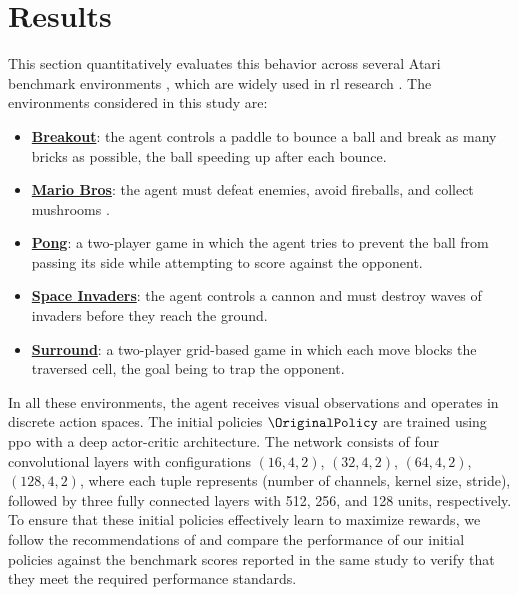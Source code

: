 \section{Results}
\label{sec:clustering_agent_representation_results}

This section quantitatively evaluates this behavior across several Atari benchmark environments \cite{Bellemare_2013}, which are widely used in \gls{rl} research \cite{mnih2013playingatarideepreinforcement, schulman2017proximalpolicyoptimizationalgorithms, zahavy2017graying}.
The environments considered in this study are:

\begin{itemize}
    \item \href{https://ale.farama.org/environments/breakout/}{\textbf{Breakout}}: the agent controls a paddle to bounce a ball and break as many bricks as possible, the ball speeding up after each bounce.
    \item \href{https://ale.farama.org/environments/mario_bros/}{\textbf{Mario Bros}}: the agent must defeat enemies, avoid fireballs, and collect mushrooms \cite{mario_bros_atari_2600}.
    \item \href{https://ale.farama.org/environments/pong/}{\textbf{Pong}}: a two-player game in which the agent tries to prevent the ball from passing its side while attempting to score against the opponent.
    \item \href{https://ale.farama.org/environments/space_invaders/}{\textbf{Space Invaders}}: the agent controls a cannon and must destroy waves of invaders before they reach the ground.
    \item \href{https://ale.farama.org/environments/surround/}{\textbf{Surround}}: a two-player grid-based game in which each move blocks the traversed cell, the goal being to trap the opponent.
\end{itemize}

In all these environments, the agent receives visual observations and operates in discrete action spaces.
The initial policies $\OriginalPolicy$ are trained using \gls{ppo} \cite{schulman2017proximalpolicyoptimizationalgorithms} with a deep actor-critic architecture.
The network consists of four convolutional layers with configurations $(16, 4, 2)$, $(32, 4, 2)$, $(64, 4, 2)$, $(128, 4, 2)$, where each tuple represents (number of channels, kernel size, stride), followed by three fully connected layers with 512, 256, and 128 units, respectively.
To ensure that these initial policies effectively learn to maximize rewards, we follow the recommendations of \cite{machado2017revisitingarcadelearningenvironment} and compare the performance of our initial policies against the benchmark scores reported in the same study to verify that they meet the required performance standards.

